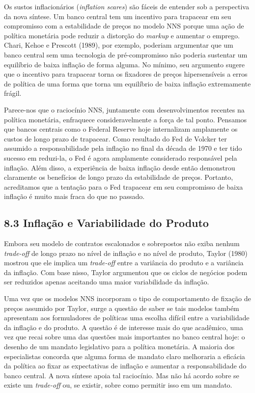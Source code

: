 \documentclass[12pt]{article}
\begin{document}
Os sustos inflacionários (\textit{inflation scares}) são fáceis de entender sob a perspectiva da nova síntese. Um banco central tem um incentivo para trapacear em seu compromisso com a estabilidade de preços no modelo NNS porque uma ação de política monetária pode reduzir a distorção do \textit{markup} e aumentar o emprego. Chari, Kehoe e Prescott (1989), por exemplo, poderiam argumentar que um banco central sem uma tecnologia de pré-compromisso não poderia sustentar um equilíbrio de baixa inflação de forma alguma. No mínimo, seu argumento sugere que o incentivo para trapacear torna os fixadores de preços hipersensíveis a erros de política de uma forma que torna um equilíbrio de baixa inflação extremamente frágil.

Parece-nos que o raciocínio NNS, juntamente com desenvolvimentos recentes na política monetária, enfraquece consideravelmente a força de tal ponto. Pensamos que bancos centrais como o Federal Reserve hoje internalizam amplamente os custos de longo prazo de trapacear. Como resultado do Fed de Volcker ter assumido a responsabilidade pela inflação no final da década de 1970 e ter tido sucesso em reduzi-la, o Fed é agora amplamente considerado responsável pela inflação. Além disso, a experiência de baixa inflação desde então demonstrou claramente os benefícios de longo prazo da estabilidade de preços. Portanto, acreditamos que a tentação para o Fed trapacear em seu compromisso de baixa inflação é muito mais fraca do que no passado.

\subsection{8.3 Inflação e Variabilidade do Produto}

Embora seu modelo de contratos escalonados e sobrepostos não exiba nenhum \textit{trade-off} de longo prazo no nível de inflação e no nível de produto, Taylor (1980) mostrou que ele implica um \textit{trade-off} entre a variância do produto e a variância da inflação. Com base nisso, Taylor argumentou que os ciclos de negócios podem ser reduzidos apenas aceitando uma maior variabilidade da inflação.

Uma vez que os modelos NNS incorporam o tipo de comportamento de fixação de preços assumido por Taylor, surge a questão de saber se tais modelos também apresentam aos formuladores de políticas uma escolha difícil entre a variabilidade da inflação e do produto. A questão é de interesse mais do que acadêmico, uma vez que recai sobre uma das questões mais importantes no banco central hoje: o desenho de um mandato legislativo para a política monetária. A maioria dos especialistas concorda que alguma forma de mandato claro melhoraria a eficácia da política ao fixar as expectativas de inflação e aumentar a responsabilidade do banco central. A nova síntese apoia tal raciocínio. Mas não há acordo sobre se existe um \textit{trade-off} ou, se existir, sobre como permitir isso em um mandato.
\end{document}
